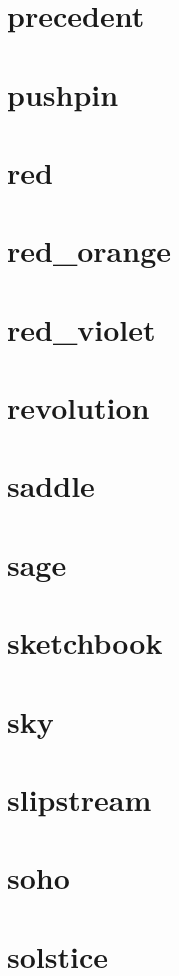 \section{precedent}
\newpage
\section{pushpin}
\newpage
\section{red}
\newpage
\section{red\_orange}
\newpage
\section{red\_violet}
\newpage
\section{revolution}
\newpage
\section{saddle}
\newpage
\section{sage}
\newpage
\section{sketchbook}
\newpage
\section{sky}
\newpage
\section{slipstream}
\newpage
\section{soho}
\newpage
\section{solstice}
\newpage
